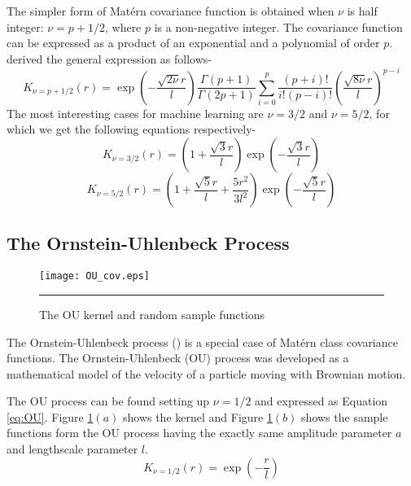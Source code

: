 The simpler form of Mat{\'e}rn covariance function is obtained when $\nu$ is half integer: $\nu = p+1/2$, where $p$ is a non-negative integer. The covariance function can be expressed as a product of an exponential and a polynomial of order $p$. \cite{Abramowitz:1965} derived the general expression as follows-
\begin{equation} \label{eq:MaternGeneral}
K_{\nu=p+1/2}(r)= \exp \left( - \frac{\sqrt{2\nu}r}{l}\right)\frac{\Gamma\left(p+1\right)}{\Gamma\left(2p+1\right)}
		\sum_{i=0}^{p}\frac{\left(p+i\right)!}{i!\left(p-i\right)!}
		\left(\frac{\sqrt{8\nu}r}{l}\right)^{p-i}
\end{equation}
The most interesting cases for machine learning are $\nu =3/2$ and $\nu=5/2$, for which we get the following equations respectively-
\begin{equation} \label{eq:Matern32}
K_{\nu=3/2}(r)= \left(1+ \frac{\sqrt{3}r}{l} \right)\exp \left( - \frac{\sqrt{3}r}{l} \right)
\end{equation}
\begin{equation} \label{eq:Matern52}
K_{\nu=5/2}(r)= \left(1+ \frac{\sqrt{5}r}{l} + \frac{5r^2}{3l^2} \right)
		\exp \left( - \frac{\sqrt{5}r}{l} \right)
\end{equation}

\subsection{The Ornstein-Uhlenbeck Process}
\begin{figure}[t]
	\centering
		\texttt{[image: OU\_cov.eps]}
		\rule{35em}{0.5pt}
	\caption[The OU kernel and random sample functions]
		{The OU kernel and random sample functions}
	\label{fig:OU_covariance}
\end{figure}
The Ornstein-Uhlenbeck process (\cite{Ornstein_Uhlenbeck:1930}) is a special case of Mat{\'e}rn class covariance functions. The Ornstein-Uhlenbeck (OU) process was developed as a mathematical model of the velocity of a particle moving with Brownian motion.

The OU process can be found setting up $\nu=1/2$ and expressed as Equation \ref{eq:OU}. Figure \ref{fig:OU_covariance}$(a)$ shows the kernel and Figure \ref{fig:OU_covariance}$(b)$ shows the sample functions form the OU process having the exactly same amplitude parameter $a$ and lengthscale parameter $l$.  
\begin{equation} \label{eq:OU}
K_{\nu=1/2}(r)=	\exp \left(-\frac{r}{l} \right)
\end{equation}


